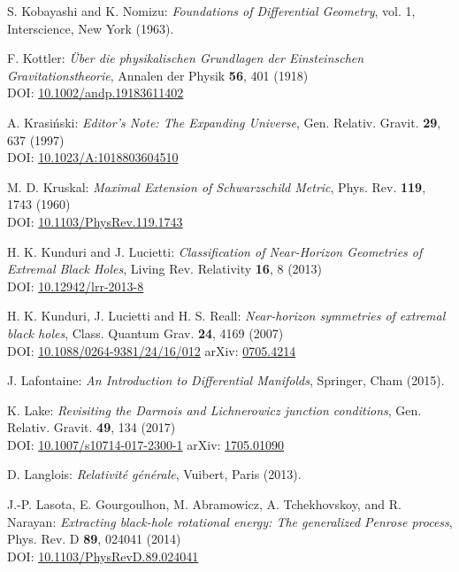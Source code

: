 \begin{thebibliography}{123}
S. Kobayashi and K. Nomizu:
{\em Foundations of Differential Geometry}, vol. 1,
Interscience, New York (1963).

F.  Kottler:
{\em \"Uber die physikalischen Grundlagen der Einsteinschen Gravitationstheorie},
Annalen der Physik {\bf 56}, 401 (1918)\\
DOI: \href{https://doi.org/10.1002/andp.19183611402}{10.1002/andp.19183611402}

A. Krasi\'nski:
{\em Editor's Note: The Expanding Universe},
Gen. Relativ. Gravit. {\bf 29}, 637 (1997)\\
DOI: \href{https://doi.org/10.1023/A:1018803604510}{10.1023/A:1018803604510}

M. D. Kruskal:
{\em Maximal Extension of Schwarzschild Metric},
Phys. Rev. {\bf 119}, 1743 (1960)\\
DOI: \href{https://doi.org/10.1103/PhysRev.119.1743}{10.1103/PhysRev.119.1743}

H. K. Kunduri and J. Lucietti:
{\em Classification of Near-Horizon Geometries of Extremal Black Holes},
Living Rev. Relativity {\bf 16}, 8 (2013)\\
DOI: \href{https://doi.org/10.12942/lrr-2013-8}{10.12942/lrr-2013-8}

H. K. Kunduri, J. Lucietti and H. S. Reall:
{\em Near-horizon symmetries of extremal black holes},
Class. Quantum Grav. {\bf 24}, 4169 (2007)\\
DOI: \href{https://doi.org/10.1088/0264-9381/24/16/012}{10.1088/0264-9381/24/16/012}\hfill
arXiv: \href{https://arxiv.org/abs/0705.4214}{0705.4214}

J. Lafontaine: {\em An Introduction to Differential Manifolds},
Springer, Cham (2015).

K. Lake:
{\em Revisiting the Darmois and Lichnerowicz junction conditions},
Gen. Relativ. Gravit. {\bf 49}, 134 (2017)\\
DOI: \href{https://doi.org/10.1007/s10714-017-2300-1}{10.1007/s10714-017-2300-1}\hfill
arXiv: \href{https://arxiv.org/abs/1705.01090}{1705.01090}

D. Langlois: \emph{Relativit\'e g\'en\'erale},
Vuibert, Paris (2013).

J.-P. Lasota, E. Gourgoulhon, M. Abramowicz, A. Tchekhovskoy,
and R. Narayan:
{\em Extracting black-hole rotational energy: The generalized Penrose process},
Phys. Rev. D {\bf 89}, 024041 (2014)  \\
DOI: \href{https://doi.org/10.1103/PhysRevD.89.024041}{10.1103/PhysRevD.89.024041}


\end{thebibliography}

